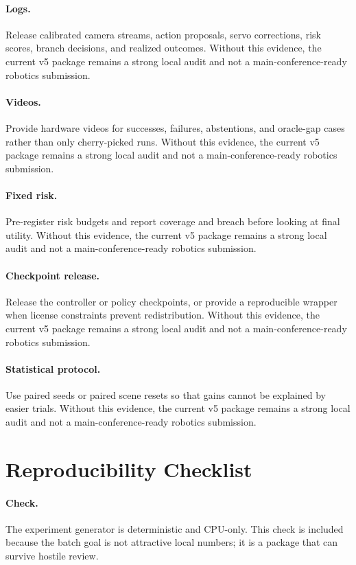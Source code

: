 \documentclass{article}
\begin{document}
\paragraph{Logs.} Release calibrated camera streams, action proposals, servo corrections, risk scores, branch decisions, and realized outcomes. Without this evidence, the current v5 package remains a strong local audit and not a main-conference-ready robotics submission.
\paragraph{Videos.} Provide hardware videos for successes, failures, abstentions, and oracle-gap cases rather than only cherry-picked runs. Without this evidence, the current v5 package remains a strong local audit and not a main-conference-ready robotics submission.
\paragraph{Fixed risk.} Pre-register risk budgets and report coverage and breach before looking at final utility. Without this evidence, the current v5 package remains a strong local audit and not a main-conference-ready robotics submission.
\paragraph{Checkpoint release.} Release the controller or policy checkpoints, or provide a reproducible wrapper when license constraints prevent redistribution. Without this evidence, the current v5 package remains a strong local audit and not a main-conference-ready robotics submission.
\paragraph{Statistical protocol.} Use paired seeds or paired scene resets so that gains cannot be explained by easier trials. Without this evidence, the current v5 package remains a strong local audit and not a main-conference-ready robotics submission.
\clearpage
\section{Reproducibility Checklist}
\paragraph{Check.} The experiment generator is deterministic and CPU-only. This check is included because the batch goal is not attractive local numbers; it is a package that can survive hostile review.
\end{document}
